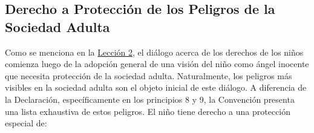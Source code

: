 \documentclass{tufte-handout}
\begin{document}
\subsection{Derecho a Protección de los Peligros de la Sociedad Adulta}\label{proteccion}


Como se menciona en la \hyperref[subsec:visiones]{Lección 2}, el diálogo acerca de los derechos de los niños comienza luego de la adopción general de una visión del niño como ángel inocente que necesita protección de la sociedad adulta. Naturalmente, los peligros más visibles en la sociedad adulta son el objeto inicial de este diálogo. A diferencia de la Declaración, específicamente en los principios 8 y 9, la Convención presenta una lista exhaustiva de estos peligros. El niño tiene derecho a una protección especial de:
\end{document}
